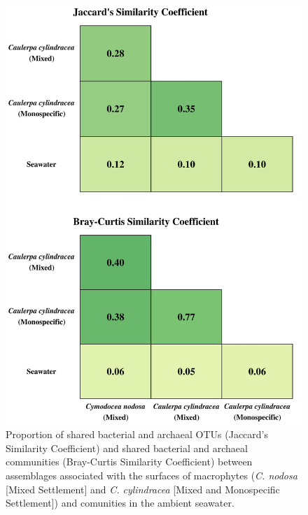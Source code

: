 \documentclass[12pt,]{article}
\begin{document}
\begin{figure}[H]

{\centering \includegraphics[width=0.7\linewidth]{../results/figures/matrix} 

}

\caption{Proportion of shared bacterial and archaeal OTUs (Jaccard's Similarity Coefficient) and shared bacterial and archaeal communities (Bray-Curtis Similarity Coefficient) between assemblages associated with the surfaces of macrophytes (\textit{C. nodosa} [Mixed Settlement] and \textit{C. cylindracea} [Mixed and Monospecific Settlement]) and comunities in the ambient seawater.\label{matrix}}\label{fig:unnamed-chunk-1}
\end{figure}
\end{document}
